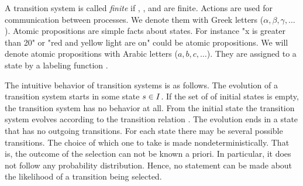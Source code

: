 \documentclass[preview]{standalone}
\begin{document}
A transition system is called \emph{finite} if \states, \atomicprops, and  are finite. Actions are used for communication between processes. We denote them with Greek letters ($\alpha, \beta, \gamma, \dots$). Atomic propositions are simple facts about states. For instance "x is greater than 20" or "red and yellow light are on" could be atomic propositions. We will denote atomic propositions with Arabic letters ($a,b,c,\dots$). They are assigned to a state by a labeling function .

The intuitive behavior of transition systems is as follows. The evolution of a transition system starts in some state ${s} \in {I}$. If the set of \initstates of initial states is empty, the transition system has no behavior at all. From the initial state the transition system evolves according to the transition relation \transitionrel. The evolution ends in a state that has no outgoing transitions. For each state there may be several possible transitions. The choice of which one to take is made nondeterministically. That is, the outcome of the selection can not be known a priori. In particular, it does not follow any probability distribution. Hence, no statement can be made about the likelihood of a transition being selected.
\end{document}

